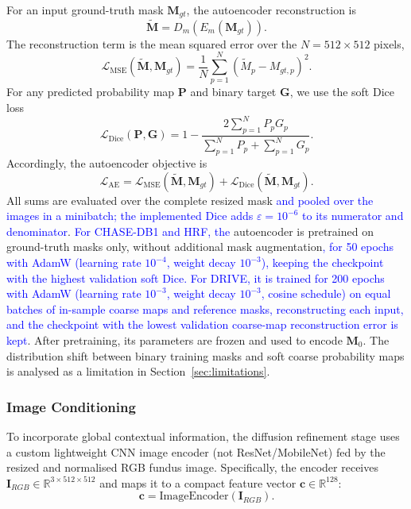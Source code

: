\documentclass[jimaging,article,submit,pdftex,moreauthors]
  {Definitions/mdpi}
\DeclareRobustCommand{\rev}[1]{\textcolor{blue}{#1}}
\DeclareRobustCommand{\rev}[1]{#1}
\providecommand{\linelabel}[1]{}
\newcommand{\secend}[1]{\linelabel{rev:end:#1}}
\begin{document}
For an input ground-truth mask $\mathbf{M}_{gt}$, the autoencoder reconstruction is
\begin{equation}
\tilde{\mathbf{M}}=D_m\!\left(E_m(\mathbf{M}_{gt})\right).
\end{equation}
The reconstruction term is the mean squared error over the $N=512\times512$ pixels,
\begin{equation}
\mathcal{L}_{\text{MSE}}(\tilde{\mathbf{M}},\mathbf{M}_{gt})=
\frac{1}{N}\sum_{p=1}^{N}
\left(\tilde{M}_{p}-M_{gt,p}\right)^2.
\end{equation}
For any predicted probability map $\mathbf{P}$ and binary target $\mathbf{G}$, we use the soft Dice loss
\begin{equation}
\mathcal{L}_{\text{Dice}}(\mathbf{P},\mathbf{G})=
1-\frac{2\sum_{p=1}^{N}P_pG_p}
{\sum_{p=1}^{N}P_p+\sum_{p=1}^{N}G_p}.
\end{equation}
Accordingly, the autoencoder objective is
\begin{equation}
\mathcal{L}_{\text{AE}} =
\mathcal{L}_{\text{MSE}}(\tilde{\mathbf{M}},\mathbf{M}_{gt})+
\mathcal{L}_{\text{Dice}}(\tilde{\mathbf{M}},\mathbf{M}_{gt}).
\end{equation}
All sums are evaluated over the complete resized mask\rev{ and pooled over the images in a minibatch; the implemented Dice adds $\varepsilon=10^{-6}$ to its numerator and denominator}. \rev{For CHASE-DB1 and HRF, the} autoencoder is pretrained on ground-truth masks only, without additional mask augmentation\rev{, for 50 epochs with AdamW (learning rate $10^{-4}$, weight decay $10^{-3}$), keeping the checkpoint with the highest validation soft Dice. For DRIVE, it is trained for 200 epochs with AdamW (learning rate $10^{-3}$, weight decay $10^{-3}$, cosine schedule) on equal batches of in-sample coarse maps and reference masks, reconstructing each input, and the checkpoint with the lowest validation coarse-map reconstruction error is kept}. After pretraining, its parameters are frozen and used to encode $\mathbf{M}_0$. The distribution shift between binary training masks and soft coarse probability maps is analysed as a limitation in Section~\ref{sec:limitations}.\secend{autoencoder}

\subsubsection{Image Conditioning}

To incorporate global contextual information, the diffusion refinement stage uses a custom lightweight CNN image encoder (not ResNet/MobileNet) fed by the resized and normalised RGB fundus image. Specifically, the encoder receives $\mathbf{I}_{RGB}\in\mathbb{R}^{3\times512\times512}$ and maps it to a compact feature vector $\mathbf{c}\in\mathbb{R}^{128}$:
\begin{equation}
\mathbf{c}=\mathrm{ImageEncoder}(\mathbf{I}_{RGB}).
\end{equation}
\end{document}
